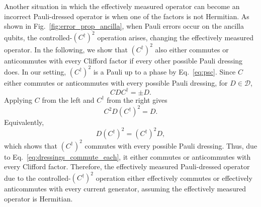 \documentclass[
 reprint,
 amsmath,amssymb,
 pra,superscriptaddress, nofootinbib
]{revtex4-2}
\theoremstyle{definition}
\theoremstyle{plain}
\begin{document}
Another situation in which the effectively measured operator can become an incorrect Pauli-dressed operator is when one of the factors is not Hermitian. 
As shown in Fig.~\ref{fig:error_prop_ancilla}, when Pauli errors occur on the ancilla qubits, the controlled-$(C^\dagger)^2$ operation arises, changing the effectively measured operator. 
In the following, we show that $(C^\dagger)^2$ also either commutes or anticommutes with every Clifford factor if every other possible Pauli dressing does.
In our setting, $(C^\dagger)^2$ is a Pauli up to a phase by Eq.~\eqref{eq:psc}. 
Since $C$ either commutes or anticommutes with every possible Pauli dressing, for $D\in\mathcal{D}$, 
\begin{equation}
  C D C^\dagger=\pm D. 
\end{equation}
Applying $C$ from the left and $C^\dagger$ from the right gives 
\begin{equation}
  C^2 D (C^\dagger)^2=D. 
\end{equation}
Equivalently,
\begin{equation}
  D (C^\dagger)^2=(C^\dagger)^2 D, 
\end{equation}
which shows that $(C^\dagger)^2$ commutes with every possible Pauli dressing.
Thus, due to Eq.~\eqref{eq:dressings_commute_each}, it either commutes or anticommutes with every Clifford factor.
Therefore, the effectively measured Pauli-dressed operator due to the controlled-$(C^\dagger)^2$ operation either effectively commutes or effectively anticommutes with every current generator, assuming the effectively measured operator is Hermitian.
\end{document}
